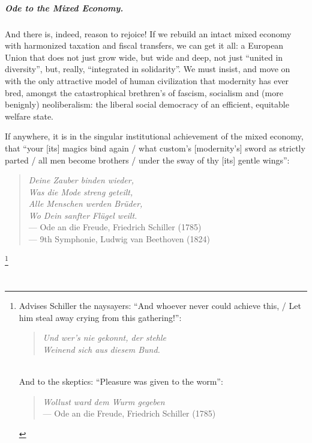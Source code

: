 \documentclass[11pt,a4paper,oneside,openright]{article}
\begin{document}
\paragraph{Ode to the Mixed Economy.} And there is, indeed, reason to rejoice! If we rebuild an intact mixed economy with harmonized taxation and fiscal transfers, we can get it all: 
a European Union that does not just grow wide, but wide and deep, not just ``united in diversity'', but, really, ``integrated in solidarity''. 
We must insist, and move on with the only attractive model of human civilization that modernity has ever bred, amongst the catastrophical brethren's of fascism, socialism and (more benignly) neoliberalism: 
the liberal social democracy of an efficient, equitable welfare state.

If anywhere, it is in the singular institutional achievement of the mixed economy, that ``your [its] magics bind again / what custom's [modernity's] sword as strictly parted / all men become brothers / under the sway of thy [its] gentle wings'':
\begin{verse}
	\emph{Deine Zauber binden wieder,}\\
	\emph{Was die Mode streng geteilt,}\\
	\emph{Alle Menschen werden Br\"{u}der,}\\
	\emph{Wo Dein sanfter Fl\"{u}gel weilt.}\\
	--- Ode an die Freude, Friedrich Schiller (1785)\\
	--- 9th Symphonie, Ludwig van Beethoven (1824)
\end{verse}

\footnote{
	Advises Schiller the naysayers: 
	``And whoever never could achieve this, / Let him steal away crying from this gathering!'':
	\begin{verse}
		\emph{Und wer's nie gekonnt, der stehle}\\
		\emph{Weinend sich aus diesem Bund.}\\
	\end{verse}\\
	And to the skeptics: 
	``Pleasure was given to the worm'':
	\begin{verse}
		\emph{Wollust ward dem Wurm gegeben}\\
		--- Ode an die Freude, Friedrich Schiller (1785) 
	\end{verse}
}

\pagebreak

\appendix
\chapter{\appendixname}

\glsaddall
\renewcommand*{\glspostdescription}{}
\printglossaries

\pagebreak

\end{document}
